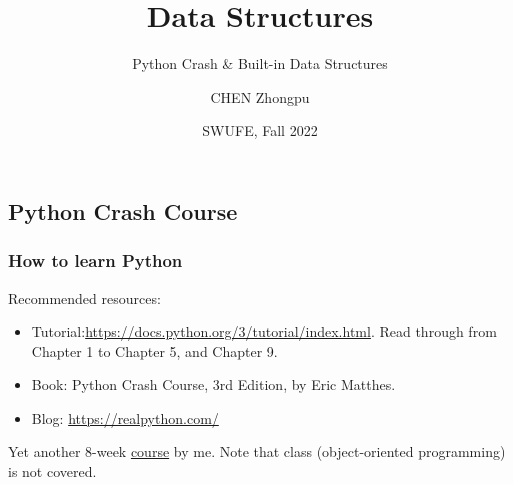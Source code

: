 \documentclass[aspectratio=169, 14pt]{beamer}
\title[Data Structures] %
{Data Structures}
\subtitle{Python Crash \& Built-in Data Structures}
\author[CHEN Zhongpu] %
{CHEN Zhongpu}
\institute[] %
{
	School of Computing and Artificial Intelligence \\
	\href{mailto:zpchen@swufe.edu.cn}{zpchen@swufe.edu.cn}
}
\date[] %
{SWUFE, Fall 2022}
\begin{document}
\frame{\titlepage}


{
	\begin{frame}
		\section{\textcolor{darkmidnightblue}{Python Crash Course}}
	\end{frame}
}

\begin{frame}
	\frametitle{How to learn Python}
	Recommended resources:

	\begin{itemize}
		\item {} Tutorial:\url{https://docs.python.org/3/tutorial/index.html}. Read through from Chapter 1 to Chapter 5, and Chapter 9.
		\item {} Book: Python Crash Course, 3rd Edition, by Eric Matthes.
		\item {} Blog: \url{https://realpython.com/}
	\end{itemize}
	Yet another 8-week \href{https://github.com/ChenZhongPu/python-swufe}{course} by me. Note that \alert{class} (object-oriented programming) is not covered.
\end{frame}
\end{document}
